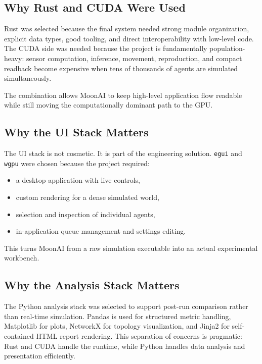 \subsection{Why Rust and CUDA Were Used}

Rust was selected because the final system needed strong module organization, explicit data
types, good tooling, and direct interoperability with low-level code. The CUDA side was needed
because the project is fundamentally population-heavy: sensor computation, inference,
movement, reproduction, and compact readback become expensive when tens of thousands of agents
are simulated simultaneously.

The combination allows MoonAI to keep high-level application flow readable while still moving
the computationally dominant path to the GPU.

\subsection{Why the UI Stack Matters}

The UI stack is not cosmetic. It is part of the engineering solution. \texttt{egui} and
\texttt{wgpu} were chosen because the project required:

\begin{itemize}[nosep]
  \item a desktop application with live controls,
  \item custom rendering for a dense simulated world,
  \item selection and inspection of individual agents,
  \item in-application queue management and settings editing.
\end{itemize}

This turns MoonAI from a raw simulation executable into an actual experimental workbench.

\subsection{Why the Analysis Stack Matters}

The Python analysis stack was selected to support post-run comparison rather than real-time
simulation. Pandas is used for structured metric handling, Matplotlib for plots, NetworkX for
topology visualization, and Jinja2 for self-contained HTML report rendering. This separation of
concerns is pragmatic: Rust and CUDA handle the runtime, while Python handles data analysis and
presentation efficiently.

